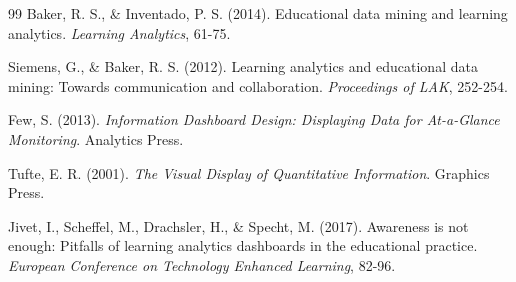 \documentclass[11pt]{article}
\begin{document}
\begin{thebibliography}{99}
Baker, R. S., \& Inventado, P. S. (2014). Educational data mining and learning analytics. \textit{Learning Analytics}, 61-75.

Siemens, G., \& Baker, R. S. (2012). Learning analytics and educational data mining: Towards communication and collaboration. \textit{Proceedings of LAK}, 252-254.

Few, S. (2013). \textit{Information Dashboard Design: Displaying Data for At-a-Glance Monitoring}. Analytics Press.

Tufte, E. R. (2001). \textit{The Visual Display of Quantitative Information}. Graphics Press.

Jivet, I., Scheffel, M., Drachsler, H., \& Specht, M. (2017). Awareness is not enough: Pitfalls of learning analytics dashboards in the educational practice. \textit{European Conference on Technology Enhanced Learning}, 82-96.

\end{thebibliography}
\end{document}
